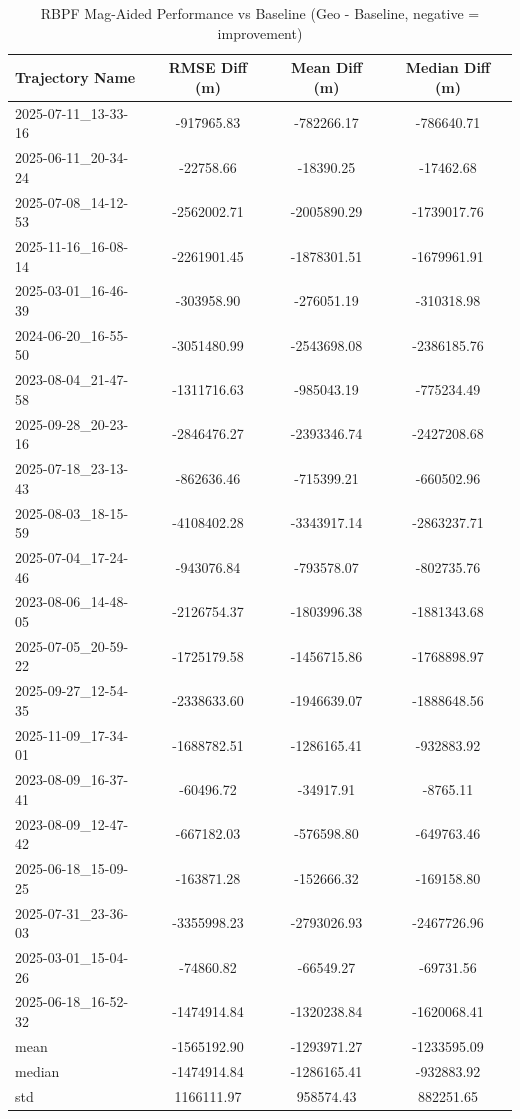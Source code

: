 \begin{table}[h]
    \centering
    \caption{RBPF Mag-Aided Performance vs Baseline (Geo - Baseline, negative = improvement)}
    \begin{tabular}{ || l || c c c || }
    \toprule
    Trajectory Name & RMSE Diff (m) & Mean Diff (m) & Median Diff (m) \\
    \midrule
    2025-07-11\_13-33-16 & -917965.83 & -782266.17 & -786640.71 \\
    2025-06-11\_20-34-24 & -22758.66 & -18390.25 & -17462.68 \\
    2025-07-08\_14-12-53 & -2562002.71 & -2005890.29 & -1739017.76 \\
    2025-11-16\_16-08-14 & -2261901.45 & -1878301.51 & -1679961.91 \\
    2025-03-01\_16-46-39 & -303958.90 & -276051.19 & -310318.98 \\
    2024-06-20\_16-55-50 & -3051480.99 & -2543698.08 & -2386185.76 \\
    2023-08-04\_21-47-58 & -1311716.63 & -985043.19 & -775234.49 \\
    2025-09-28\_20-23-16 & -2846476.27 & -2393346.74 & -2427208.68 \\
    2025-07-18\_23-13-43 & -862636.46 & -715399.21 & -660502.96 \\
    2025-08-03\_18-15-59 & -4108402.28 & -3343917.14 & -2863237.71 \\
    2025-07-04\_17-24-46 & -943076.84 & -793578.07 & -802735.76 \\
    2023-08-06\_14-48-05 & -2126754.37 & -1803996.38 & -1881343.68 \\
    2025-07-05\_20-59-22 & -1725179.58 & -1456715.86 & -1768898.97 \\
    2025-09-27\_12-54-35 & -2338633.60 & -1946639.07 & -1888648.56 \\
    2025-11-09\_17-34-01 & -1688782.51 & -1286165.41 & -932883.92 \\
    2023-08-09\_16-37-41 & -60496.72 & -34917.91 & -8765.11 \\
    2023-08-09\_12-47-42 & -667182.03 & -576598.80 & -649763.46 \\
    2025-06-18\_15-09-25 & -163871.28 & -152666.32 & -169158.80 \\
    2025-07-31\_23-36-03 & -3355998.23 & -2793026.93 & -2467726.96 \\
    2025-03-01\_15-04-26 & -74860.82 & -66549.27 & -69731.56 \\
    2025-06-18\_16-52-32 & -1474914.84 & -1320238.84 & -1620068.41 \\
    \midrule
    mean & -1565192.90 & -1293971.27 & -1233595.09 \\
    median & -1474914.84 & -1286165.41 & -932883.92 \\
    std & 1166111.97 & 958574.43 & 882251.65 \\
    \bottomrule
    \end{tabular}
    \label{tab:rbpf_mag_results}
\end{table}